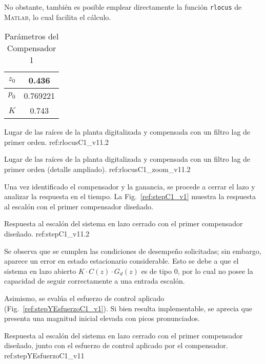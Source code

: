 No obstante, tambi\'en es posible emplear directamente la funci\'on \texttt{rlocus} de \textsc{Matlab}, lo cual facilita el c\'alculo.  
\begin{table}[H]
	\centering
	\caption{Parámetros del Compensador 1}
	\begin{tabular}{|c|c|}
		\hline
		$z_0$ & 0.436 \\ \hline
		$p_0$ & 0.769221 \\ \hline
		$K$   & 0.743 \\ \hline
	\end{tabular}
\end{table}



{Lugar de las ra\'ices de la planta digitalizada y compensada con un filtro lag de primer orden.}
{ref:rlocusC1_v1}{1.2}

{Lugar de las ra\'ices de la planta digitalizada y compensada con un filtro lag de primer orden (detalle ampliado).}
{ref:rlocusC1_zoom_v1}{1.2}

Una vez identificado el compensador y la ganancia, se procede a cerrar el lazo y analizar la respuesta en el tiempo. La Fig.~\ref{ref:stepC1_v1} muestra la respuesta al escal\'on con el primer compensador dise\~nado.  

{Respuesta al escal\'on del sistema en lazo cerrado con el primer compensador dise\~nado.}
{ref:stepC1_v1}{1.2}

Se observa que se cumplen las condiciones de desempe\~no solicitadas; sin embargo, aparece un error en estado estacionario considerable. Esto se debe a que el sistema en lazo abierto $K \cdot C(z) \cdot G_d(z)$ es de tipo 0, por lo cual no posee la capacidad de seguir correctamente a una entrada escal\'on.  

Asimismo, se eval\'ua el esfuerzo de control aplicado (Fig.~\ref{ref:stepYEsfuerzoC1_v1}). Si bien resulta implementable, se aprecia que presenta una magnitud inicial elevada con picos pronunciados.  

{Respuesta al escal\'on del sistema en lazo cerrado con el primer compensador dise\~nado, junto con el esfuerzo de control aplicado por el compensador.}
{ref:stepYEsfuerzoC1_v1}{1}


